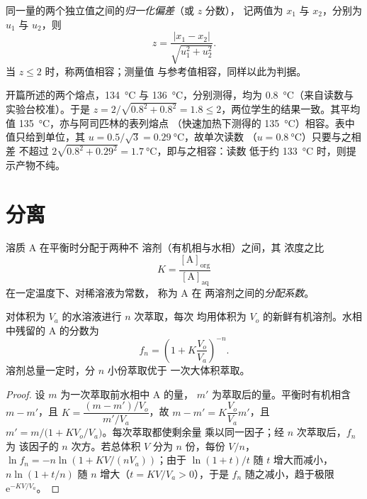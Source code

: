 \begin{definition}[归一化偏差]\label{def:b1:lab-techniques-1:z-score}
同一量的两个独立值之间的\emph{归一化偏差}（或 $z$ 分数），
记两值为 $x_1$ 与 $x_2$，分别为
$u_1$ 与 $u_2$，则
\[
  z = \frac{|x_1 - x_2|}{\sqrt{u_1^2 + u_2^2}} .
\]
当 $z \le 2$ 时，称两值相容；测量值
与参考值相容，同样以此为判据。
\end{definition}

\begin{example}[两位学生]
开篇所述的两个熔点，\qty{134}{\celsius} 与
\qty{136}{\celsius}，分别测得，均为
\qty{0.8}{\celsius}（来自读数与实验台校准）。于是
$z = 2/\sqrt{0.8^2 + 0.8^2} = 1.8 \le 2$，两位学生的结果一致。其平均值
\qty{135}{\celsius}，亦与阿司匹林的表列熔点
（快速加热下测得的 \qty{135}{\celsius}）相容。表中值只给到单位，其
$u = 0.5/\sqrt3 = \qty{0.29}{\celsius}$，故单次读数
（$u = \qty{0.8}{\celsius}$）只要与之相差
不超过 $2\sqrt{0.8^2 + 0.29^2} = \qty{1.7}{\celsius}$，即与之相容：读数
低于约 \qty{133}{\celsius} 时，则提示产物不纯。
\end{example}

\section{分离}

\begin{definition}[分配系数]\label{def:b1:lab-techniques-1:partition-coefficient}
溶质 A 在平衡时分配于两种不
溶剂（有机相与水相）之间，其
浓度之比
\[
  K = \frac{[\mathrm{A}]_{\mathrm{org}}}{[\mathrm{A}]_{\mathrm{aq}}}
\]
在一定温度下、对稀溶液为常数，
称为 A 在
两溶剂之间的\emph{分配系数}。
\end{definition}

\begin{proposition}[多次萃取优于一次萃取]\label{prop:b1:lab-techniques-1:multiple-extractions}
对体积为 $V_a$ 的水溶液进行 $n$ 次萃取，每次
均用体积为 $V_o$ 的新鲜有机溶剂。水相中残留的
A 的分数为
\[
  f_n = \left(1 + K \frac{V_o}{V_a}\right)^{-n}.
\]
溶剂总量一定时，分 $n$ 小份萃取优于
一次大体积萃取。
\end{proposition}
\begin{proof}
设 $m$ 为一次萃取前水相中 A 的量，
$m'$ 为萃取后的量。平衡时有机相含 $m - m'$，且
$K = \dfrac{(m - m')/V_o}{m'/V_a}$，故 $m - m' = K\dfrac{V_o}{V_a} m'$，且
$m' = m\big/\bigl(1 + K V_o/V_a\bigr)$。每次萃取都使剩余量
乘以同一因子；经 $n$ 次萃取后，$f_n$ 为
该因子的 $n$ 次方。若总体积 $V$ 分为 $n$ 份，每份 $V/n$，
$\ln f_n = -n \ln(1 + KV/(nV_a))$；由于 $\ln(1+t)/t$ 随 $t$ 增大而减小，
$n \ln(1 + t/n)$ 随 $n$ 增大（$t = KV/V_a > 0$），于是 $f_n$
随之减小，趋于极限 $\mathrm{e}^{-KV/V_a}$。
\end{proof}

